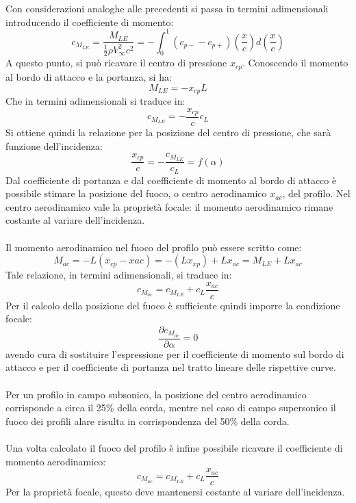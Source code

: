 Con considerazioni analoghe alle precedenti si passa in termini adimensionali introducendo il coefficiente di momento:
\begin{equation*}
    c_{M_{LE}} = \frac{M_{LE}}{\frac12 \rho V_\infty^2 c^2} = -\int_0^1 (c_{p-}-c_{p+}) \left( \frac xc \right) d\left( \frac xc \right)
\end{equation*}
A questo punto, si può ricavare il centro di pressione $x_{cp}$. Conoscendo il momento al bordo di attacco e la portanza, si ha:
\begin{equation*}
    M_{LE} = -x_{cp} L
\end{equation*}
Che in termini adimensionali si traduce in:
\begin{equation*}
    c_{M_{LE}} = - \frac{x_{cp}}c c_L
\end{equation*}
Si ottiene quindi la relazione per la posizione del centro di pressione, che sarà funzione dell'incidenza:
\begin{equation*}
    \frac{x_{cp}}c = -\frac{c_{M_{LE}}}{c_L} = f(\alpha)
\end{equation*}
Dal coefficiente di portanza e dal coefficiente di momento al bordo di attacco è possibile stimare la posizione del fuoco, o centro aerodinamico $x_{ac}$, del profilo. Nel centro aerodinamico vale la proprietà focale: il momento aerodinamico rimane costante al variare dell'incidenza.\\\\
Il momento aerodinamico nel fuoco del profilo può essere scritto come:
\begin{equation*}
    M_{ac} = - L (x_{cp}-x{ac}) = -(Lx_{xp}) + Lx_{ac} = M_{LE} + Lx_{ac}
\end{equation*}
Tale relazione, in termini adimensionali, si traduce in:
\begin{equation*}
    c_{M_{ac}} = c_{M_{LE}} + c_L \frac{x_{ac}}c
\end{equation*}
Per il calcolo della posizione del fuoco è sufficiente quindi imporre la condizione focale:
\begin{equation*}
    \frac{\partial c_{M_{ac}}}{\partial \alpha} = 0
\end{equation*}
avendo cura di sostituire l'espressione per il coefficiente di momento sul bordo di attacco e per il coefficiente di portanza nel tratto lineare delle rispettive curve.\\\\
Per un profilo in campo subsonico, la posizione del centro aerodinamico corrisponde a circa il 25\% della corda, mentre nel caso di campo supersonico il fuoco dei profili alare risulta in corrispondenza del 50\% della corda.\\\\
Una volta calcolato il fuoco del profilo è infine possibile ricavare il coefficiente di momento aerodinamico:
\begin{equation*}
    c_{M_{ac}} = c_{M_{LE}} + c_L \frac{x_{ac}}c
\end{equation*}
Per la proprietà focale, questo deve mantenersi costante al variare dell'incidenza.

